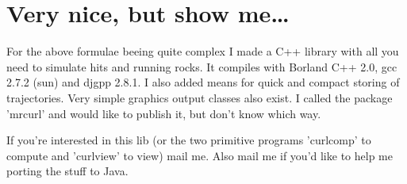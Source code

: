 
\chapter{Very nice, but show me\dots}

For the above formulae beeing quite complex I made a C++ library with all you
need to simulate hits and running rocks. It compiles with Borland C++ 2.0, gcc
2.7.2 (sun) and djgpp 2.8.1. I also added means for quick and compact storing
of trajectories. Very simple graphics output classes also exist. I called the
package 'mrcurl' and would like to publish it, but don't know which way.

If you're interested in this lib (or the two primitive programs 'curlcomp' to
compute and 'curlview' to view) mail me. Also mail me if you'd like to help me
porting the stuff to Java.

